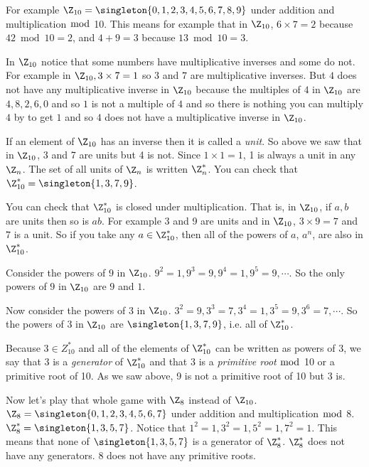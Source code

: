 \documentclass[oneside,12pt]{amsart}
\begin{document}
For example $\Z_{10} = \singleton{0,1,2,3,4,5,6,7,8,9}$ under addition and multiplication $\bmod$ 10. This means for example that in $\Z_{10}$,
$6 \times 7 = 2$ because $42 \bmod 10 = 2$, and $4 + 9 = 3$ because $13 \bmod 10 = 3$.

In $\Z_{10}$ notice that some numbers have multiplicative inverses and some do not. For
example in $\Z_{10}, 3 \times 7 = 1$ so $3$ and $7$ are multiplicative inverses. But $4$ does not have any
multiplicative inverse in $\Z_{10}$ because the multiples of $4$ in $\Z_{10}$ are $4, 8, 2, 6, 0$ and so
$1$ is not a multiple of $4$ and so there is nothing you can multiply $4$ by to get $1$ and so
$4$ does not have a multiplicative inverse in $\Z_{10}$.

If an element of $\Z_{10}$ has an inverse then it is called a \emph{unit}.
So above we saw that in $\Z_{10}$, 3 and 7 are units but 4 is not.
Since $1\times 1 = 1$, 1 is always a unit in any $\Z_n$.
The set of all units of $\Z_{n}$ is written $\Z^*_{n}$.
You can check that $\Z^*_{10} = \singleton{1,3,7,9}$.

You can check that $\Z^*_{10}$ is closed under multiplication. That is, in $\Z_{10}$, if
$a,b$ are units then so is $ab$. For example 3 and 9 are units and in $\Z_{10}$, $3\times 9 = 7$
and $7$ is a unit. So if you take any $a\in \Z^*_{10}$, then all of the powers of $a$, $a^n$, are
also in $\Z^*_{10}$.

Consider the powers of $9$ in $\Z_{10}$. $9^2=1, 9^3 = 9, 9^4 =1, 9^5 = 9, \cdots$. So the only
powers of $9$ in $\Z_{10}$ are $9$ and $1$.

Now consider the powers of $3$ in $\Z_{10}$. $3^2=9, 3^3 = 7, 3^4 =1, 3^5 = 9, 3^6 = 7, \cdots$.
So the powers of $3$ in $\Z_{10}$ are $\singleton{1,3,7,9}$, i.e. all of $\Z^*_{10}$.

Because $3\in Z^*_{10}$ and all of the elements of $\Z^*_{10}$ can be written as
powers of $3$, we say
that $3$ is a \emph{generator} of $\Z^*_{10}$ and that 3 is a \emph{primitive root} $\bmod$ 10 or a primitive
root of 10. As we saw above, 9 is not a primitive root of 10 but 3 is.

Now let's play that whole game with $\Z_8$ instead of $\Z_{10}$.
$\Z_8 = \singleton{0,1,2,3,4,5,6,7}$ under addition and multiplication $\bmod$ 8.
$\Z^*_{8} = \singleton{1,3,5,7}$. Notice that $1^2 = 1, 3^2 = 1, 5^2 = 1, 7^2 = 1$. This means
that none of $\singleton{1,3,5,7}$ is a generator of $\Z^*_{8}$. $\Z^*_{8}$ does not have any
generators. 8 does not have any primitive roots.
\end{document}
